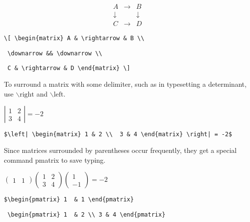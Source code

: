 \[ \begin{matrix} A & \rightarrow & B \\
    \downarrow & & \downarrow \\
     C & \rightarrow & D \end{matrix} \]

\verb"\[ \begin{matrix} A & \rightarrow & B \\"

\verb" \downarrow && \downarrow \\"

 \verb" C & \rightarrow & D \end{matrix} \]"

\bigskip

To surround a matrix with some delimiter, such as in typesetting a determinant, use $\backslash\mathrm{right}$ and $\backslash\mathrm{left}$.

\medskip

$\left| \begin{matrix} 1 & 2 \\  3 & 4 \end{matrix} \right| = -2$

\smallskip

\verb"$\left| \begin{matrix} 1 & 2 \\  3 & 4 \end{matrix} \right| = -2$"

\bigskip

Since matrices surrounded by parentheses occur frequently, they get a special command pmatrix to save typing.

\medskip

$\begin{pmatrix} 1  & 1 \end{pmatrix}
 \begin{pmatrix} 1  & 2 \\ 3 & 4 \end{pmatrix}
 \begin{pmatrix} 1 \\ -1 \end{pmatrix} 
  = -2$

\smallskip

\verb"$\begin{pmatrix} 1  & 1 \end{pmatrix}"

\verb" \begin{pmatrix} 1  & 2 \\ 3 & 4 \end{pmatrix}"

